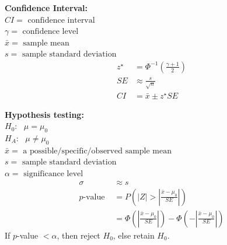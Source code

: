 \documentclass[12pt,letterpaper,addpoints]{exam}
\begin{document}
\begin{multicols}{2}
{\bf Confidence Interval:}\\
$CI = \text{ confidence interval}$\\
$\gamma = \text{ confidence level}$\\
$\bar{x} = \text{ sample mean}$ \\
$s = \text{ sample standard deviation}$ 
\begin{align*}
z^{\star} &= \Phi^{-1}\left(\frac{\gamma+1}{2} \right) \\
SE &\approx \frac{s}{\sqrt{n}}\\
CI &= \bar{x} \pm z^{\star} SE
\end{align*}

{\bf Hypothesis testing:}\\
$H_0:~~~\mu = \mu_0$\\
$H_A:~~~\mu \ne \mu_0$\\
$\bar{x} = \text{ a possible/specific/observed sample mean}$\\
$s = \text{ sample standard deviation}$\\
$\alpha = \text{ significance level} $
\begin{align*}
\sigma &\approx s\\
p\text{-value } &= P\left(\lvert Z \rvert > \left| \frac{\bar{x}-\mu_0}{SE} \right|  \right)\\
&= \Phi\left( \left| \frac{\bar{x}-\mu_0}{SE} \right| \right) - \Phi\left( -\left| \frac{\bar{x}-\mu_0}{SE} \right| \right)
\end{align*}
If $p$-value $< \alpha$, then reject $H_0$, else retain $H_0$.

\end{multicols}
\end{document}

